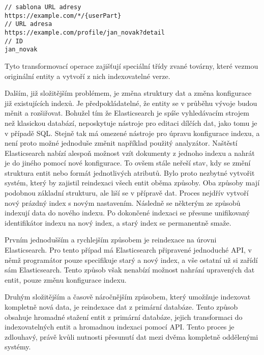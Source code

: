 		\begin{lstlisting}[caption={Ukázka transformace URL adresy na profilové ID. Zdroj: [autor]}]
// sablona URL adresy
https://example.com/*/{userPart}
// URL adresa
https://example.com/profile/jan_novak?detail
// ID
jan_novak
		\end{lstlisting}

		Tyto transformovací operace zajišťují speciální třídy zvané továrny, které vezmou originální entity a vytvoří
		z nich indexovatelné verze.

		Dalším, již složitějším problémem, je změna struktury dat a změna konfigurace již existujících indexů.
		Je předpokládatelné, že entity se v průběhu vývoje budou měnit a rozšiřovat.
		Bohužel tím že Elasticsearch je spíše vyhledávacím strojem než klasickou databází, neposkytuje nástroje pro editaci
		dílčích dat, jako tomu je v případě \ac{SQL}.
		Stejně tak má omezené nástroje pro úpravu konfigurace indexu, a není proto možné jednoduše změnit například
		použitý analyzátor.
		Naštěstí Elasticsearch nabízí alespoň možnost vzít dokumenty z jednoho indexu a nahrát je do jiného pomocí nové
		konfigurace.
		To ovšem stále neřeší stav, kdy se změní struktura entit nebo formát jednotlivých atributů.
		Bylo proto nezbytné vytvořit systém, který by zajistil reindexaci všech entit oběma způsoby.
		Oba způsoby mají podobnou základní strukturu, ale liší se v přípravě dat.
		Proces nejdřív vytvoří nový prázdný index s novým nastavením.
		Následně se některým ze způsobů indexují data do nového indexu.
		Po dokončené indexaci se přesune unifikovaný identifikátor indexu na nový index, a starý index se permanentně
		smaže.

		Prvním jednodušším a rychlejším způsobem je reindexace na úrovni Elasticsearch.
		Pro tento případ má Elasticsearch připravené jednoduché \ac{API}, v němž programátor pouze specifikuje starý a nový
		index, a vše ostatní už si zařídí sám Elasticsearch.
		Tento způsob však nenabízí možnost nahrání upravených dat entit, pouze změnu konfigurace indexu.


		Druhým složitějším a časově náročnějším způsobem, který umožňuje indexovat kompletně nová data, je
		reindexace dat z primární databáze.
		Tento způsob obsahuje hromadné stažení entit z primární databáze, jejich transformaci do indexovatelných entit
		a hromadnou indexaci pomocí \ac{API}.
		Tento proces je zdlouhavý, právě kvůli nutnosti přesunutí dat mezi dvěma kompletně oddělenými systémy.

